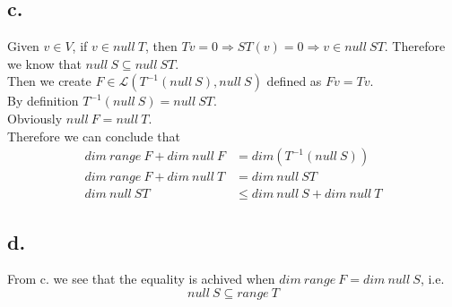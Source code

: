 \documentclass{article}
\begin{document}
\subsection*{c.}
Given $v \in V$, if $v \in null\ T$, then $Tv = 0 \Rightarrow ST(v) = 0 \Rightarrow v \in null\ ST$. Therefore we know that $null\ S \subseteq null\ ST$.\\
Then we create $F \in \mathcal{L}(T^{-1}(null\ S), null\ S)$ defined as $Fv = Tv$.\\
By definition $T^{-1}(null\ S) = null\ ST$.\\
Obviously $null\ F = null\ T$.\\
Therefore we can conclude that
\begin{equation*}
    \begin{split}
        dim\ range\ F + dim\ null\ F &= dim(T^{-1}(null\ S))\\
        dim\ range\ F + dim\ null\ T &= dim\ null\ ST\\
        dim\ null\ ST &\leq dim\ null\ S + dim\ null\ T
    \end{split}
\end{equation*}
\subsection*{d.}
From c. we see that the equality is achived when $dim\ range\ F = dim\ null\ S$, i.e.
\begin{equation*}
    null\ S \subseteq range\ T
\end{equation*}
\end{document}
